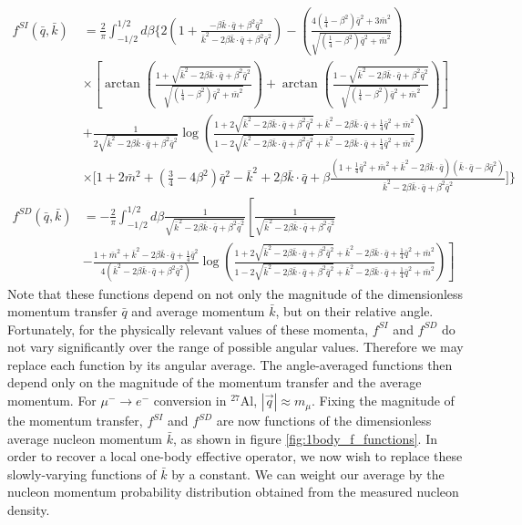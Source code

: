\documentclass{book}[letterpaper,12pt]
\begin{document}
\begin{equation}
\begin{split}
f^{SI}(\bar{q},\bar{k})&=\frac{2}{\pi}\int_{-1/2}^{1/2}d\beta\Bigg\{2\left(1+\frac{-\beta\bar{k}\cdot\bar{q}+\beta^2\bar{q}^2}{\bar{k}^2-2\beta\bar{k}\cdot\bar{q}+\beta^2\bar{q}^2}\right)-\left(\frac{4(\frac{1}{4}-\beta^2)\bar{q}^2+3\bar{m}^2}{\sqrt{(\frac{1}{4}-\beta^2)\bar{q}^2+\bar{m}^2}}\right)\\
&\times\left[\arctan\left(\frac{1+\sqrt{\bar{k}^2-2\beta\bar{k}\cdot\bar{q}+\beta^2\bar{q}^2}}{\sqrt{(\frac{1}{4}-\beta^2)\bar{q}^2+\bar{m}^2}}\right)+\arctan\left(\frac{1-\sqrt{\bar{k}^2-2\beta\bar{k}\cdot\bar{q}+\beta^2\bar{q}^2}}{\sqrt{(\frac{1}{4}-\beta^2)\bar{q}^2+\bar{m}^2}}\right)\right]\\
&+\frac{1}{2\sqrt{\bar{k}^2-2\beta\bar{k}\cdot\bar{q}+\beta^2\bar{q}^2}}\log\left(\frac{1+2\sqrt{\bar{k}^2-2\beta\bar{k}\cdot\bar{q}+\beta^2\bar{q}^2}+\bar{k}^2-2\beta\bar{k}\cdot\bar{q}+\frac{1}{4}\bar{q}^2+\bar{m}^2}{1-2\sqrt{\bar{k}^2-2\beta\bar{k}\cdot\bar{q}+\beta^2\bar{q}^2}+\bar{k}^2-2\beta\bar{k}\cdot\bar{q}+\frac{1}{4}\bar{q}^2+\bar{m}^2}\right)\\
&\times\Bigg[1+2\bar{m}^2+\left(\frac{3}{4}-4\beta^2\right)\bar{q}^2-\bar{k}^2+2\beta\bar{k}\cdot\bar{q}+\beta\frac{\left(1+\frac{1}{4}\bar{q}^2+\bar{m}^2+\bar{k}^2-2\beta\bar{k}\cdot\bar{q}\right)\left(\bar{k}\cdot\bar{q}-\beta\bar{q}^2\right)}{\bar{k}^2-2\beta\bar{k}\cdot\bar{q}+\beta^2\bar{q}^2}\Bigg]\Bigg\}\\
f^{SD}(\bar{q},\bar{k})&=-\frac{2}{\pi}\int_{-1/2}^{1/2}d\beta\frac{1}{\sqrt{\bar{k}^2-2\beta\bar{k}\cdot\bar{q}+\beta^2\bar{q}^2}}\left[\frac{1}{\sqrt{\bar{k}^2-2\beta\bar{k}\cdot\bar{q}+\beta^2\bar{q}^2}}\right.\\
&\left.-\frac{1+\bar{m}^2+\bar{k}^2-2\beta\bar{k}\cdot\bar{q}+\frac{1}{4}\bar{q}^2}{4\left(\bar{k}^2-2\beta\bar{k}\cdot\bar{q}+\beta^2\bar{q}^2\right)}\log\left(\frac{1+2\sqrt{\bar{k}^2-2\beta\bar{k}\cdot\bar{q}+\beta^2\bar{q}^2}+\bar{k}^2-2\beta\bar{k}\cdot\bar{q}+\frac{1}{4}\bar{q}^2+\bar{m}^2}{1-2\sqrt{\bar{k}^2-2\beta\bar{k}\cdot\bar{q}+\beta^2\bar{q}^2}+\bar{k}^2-2\beta\bar{k}\cdot\bar{q}+\frac{1}{4}\bar{q}^2+\bar{m}^2}\right)\right]
\end{split}
\end{equation}
Note that these functions depend on not only the magnitude of the dimensionless momentum transfer $\bar{q}$ and average momentum $\bar{k}$, but on their relative angle. Fortunately, for the physically relevant values of these momenta, $f^{SI}$ and $f^{SD}$ do not vary significantly over the range of possible angular values. Therefore we may replace each function by its angular average. The angle-averaged functions then depend only on the magnitude of the momentum transfer and the average momentum. For $\mu^-\rightarrow e^-$ conversion in $^{27}$Al, $|\vec{q}|\approx m_{\mu}$. Fixing the magnitude of the momentum transfer, $f^{SI}$ and $f^{SD}$ are now functions of the dimensionless average nucleon momentum $\bar{k}$, as shown in figure \ref{fig:1body_f_functions}. In order to recover a local one-body effective operator, we now wish to replace these slowly-varying functions of $\bar{k}$ by a constant. We can weight our average by the nucleon momentum probability distribution obtained from the measured nucleon density.
\end{document}
